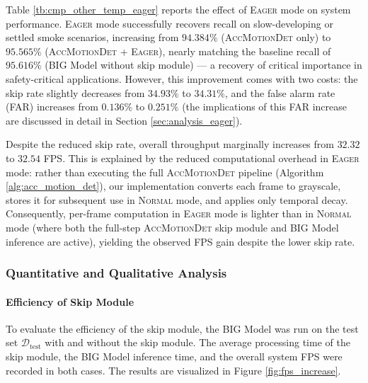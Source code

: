 \documentclass[
  10pt,
]{article}
\begin{document}


Table \ref{tb:cmp_other_temp_eager} reports the effect of \textsc{Eager}
mode on system performance. \textsc{Eager} mode successfully recovers
recall on slow-developing or settled smoke scenarios, increasing from
\(94.384\%\) (\textsc{AccMotionDet} only) to \(95.565\%\)
(\textsc{AccMotionDet} + \textsc{Eager}), nearly matching the baseline
recall of \(95.616\%\) (BIG Model without skip module) --- a recovery of
critical importance in safety-critical applications. However, this
improvement comes with two costs: the skip rate slightly decreases from
\(34.93\%\) to \(34.31\%\), and the false alarm rate (FAR) increases
from \(0.136\%\) to \(0.251\%\) (the implications of this FAR increase
are discussed in detail in Section \ref{sec:analysis_eager}).

Despite the reduced skip rate, overall throughput marginally increases
from \(32.32\) to \(32.54\) FPS. This is explained by the reduced
computational overhead in \textsc{Eager} mode: rather than executing the
full \textsc{AccMotionDet} pipeline (Algorithm
\ref{alg:acc_motion_det}), our implementation converts each frame to
grayscale, stores it for subsequent use in \textsc{Normal} mode, and
applies only temporal decay. Consequently, per-frame computation in
\textsc{Eager} mode is lighter than in \textsc{Normal} mode (where both
the full-step \textsc{AccMotionDet} skip module and BIG Model inference
are active), yielding the observed FPS gain despite the lower skip rate.

\subsubsection{Quantitative and Qualitative
Analysis}\label{quantitative-and-qualitative-analysis}

\paragraph{Efficiency of Skip Module}\label{efficiency-of-skip-module}



To evaluate the efficiency of the skip module, the BIG Model was run on
the test set \(\mathcal{D}_\text{test}\) with and without the skip
module. The average processing time of the skip module, the BIG Model
inference time, and the overall system FPS were recorded in both cases.
The results are visualized in Figure \ref{fig:fps_increase}.
\end{document}
